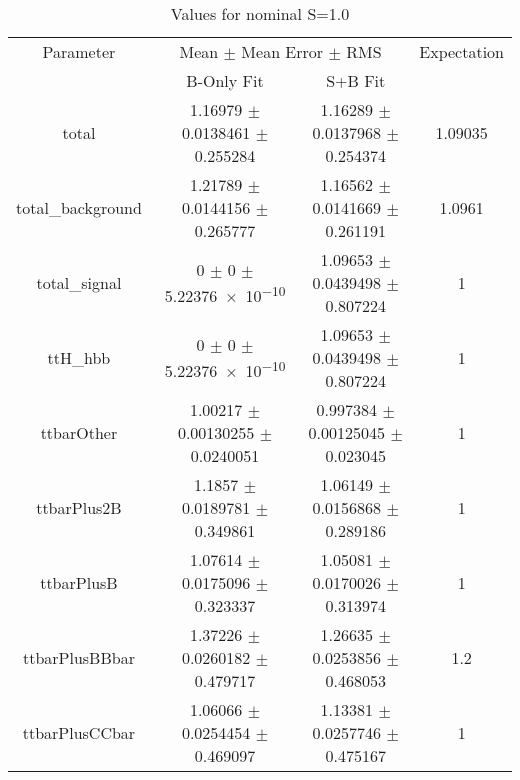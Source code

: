 \begin{table}
\centering
\caption{Values for nominal S=1.0}
\begin{tabular}{cccc}
\toprule
Parameter & \multicolumn{2}{c}{Mean $\pm$ Mean Error $\pm$ RMS} & Expectation\\
 & B-Only Fit & S+B Fit & \\
\midrule
total & \num{1.16979} $\pm$ \num{0.0138461} $\pm$ \num{0.255284} & \num{1.16289} $\pm$ \num{0.0137968} $\pm$ \num{0.254374} & \num{1.09035}\\
total\_background & \num{1.21789} $\pm$ \num{0.0144156} $\pm$ \num{0.265777} & \num{1.16562} $\pm$ \num{0.0141669} $\pm$ \num{0.261191} & \num{1.0961}\\
total\_signal & \num{0} $\pm$ \num{0} $\pm$ \num{5.22376e-10} & \num{1.09653} $\pm$ \num{0.0439498} $\pm$ \num{0.807224} & \num{1}\\
ttH\_hbb & \num{0} $\pm$ \num{0} $\pm$ \num{5.22376e-10} & \num{1.09653} $\pm$ \num{0.0439498} $\pm$ \num{0.807224} & \num{1}\\
ttbarOther & \num{1.00217} $\pm$ \num{0.00130255} $\pm$ \num{0.0240051} & \num{0.997384} $\pm$ \num{0.00125045} $\pm$ \num{0.023045} & \num{1}\\
ttbarPlus2B & \num{1.1857} $\pm$ \num{0.0189781} $\pm$ \num{0.349861} & \num{1.06149} $\pm$ \num{0.0156868} $\pm$ \num{0.289186} & \num{1}\\
ttbarPlusB & \num{1.07614} $\pm$ \num{0.0175096} $\pm$ \num{0.323337} & \num{1.05081} $\pm$ \num{0.0170026} $\pm$ \num{0.313974} & \num{1}\\
ttbarPlusBBbar & \num{1.37226} $\pm$ \num{0.0260182} $\pm$ \num{0.479717} & \num{1.26635} $\pm$ \num{0.0253856} $\pm$ \num{0.468053} & \num{1.2}\\
ttbarPlusCCbar & \num{1.06066} $\pm$ \num{0.0254454} $\pm$ \num{0.469097} & \num{1.13381} $\pm$ \num{0.0257746} $\pm$ \num{0.475167} & \num{1}\\
\bottomrule
\end{tabular}
\end{table}